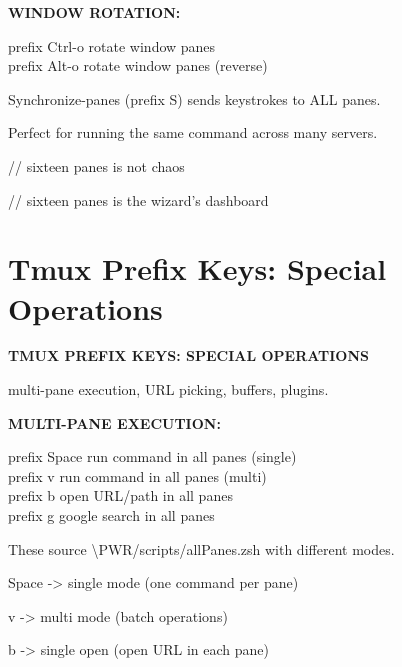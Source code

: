 \documentclass[11pt,a4paper,twoside]{book}
\begin{document}
\vspace{12pt}
{\bfseries\color{neonyellow} WINDOW ROTATION:}\vspace{4pt}

\begin{codebox}
prefix Ctrl-o         rotate window panes\\
prefix Alt-o          rotate window panes (reverse)\\
\end{codebox}

Synchronize-panes (prefix S) sends keystrokes to ALL panes.

Perfect for running the same command across many servers.

// sixteen panes is not chaos

// sixteen panes is the wizard's dashboard


\vspace{16pt}

\section{Tmux Prefix Keys: Special Operations}


\vspace{10pt}
{\large\bfseries\color{neoncyan} TMUX PREFIX KEYS: SPECIAL OPERATIONS}\vspace{6pt}

multi-pane execution, URL picking, buffers, plugins.


\vspace{12pt}
{\bfseries\color{neonyellow} MULTI-PANE EXECUTION:}\vspace{4pt}

\begin{codebox}
prefix Space          run command in all panes (single)\\
prefix v              run command in all panes (multi)\\
prefix b              open URL/path in all panes\\
prefix g              google search in all panes\\
\end{codebox}

These source \textbackslash{}PWR/scripts/allPanes.zsh with different modes.

Space -> single mode (one command per pane)

v     -> multi mode (batch operations)

b     -> single open (open URL in each pane)
\end{document}
